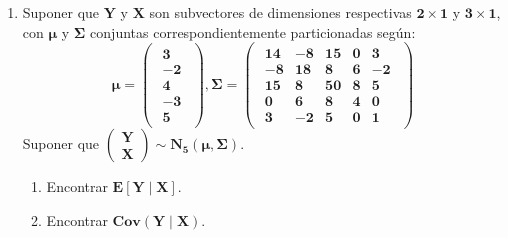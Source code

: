 \documentclass[11pt,a4paper]{article}
\begin{document}
\begin{enumerate}[label=\arabic*.]
\newpage
\bfseries
\item Suponer que $\mathbf{Y}$ y $\mathbf{X}$ son subvectores de dimensiones respectivas $\mathbf{2 \times 1}$ y $\mathbf{3 \times 1}$, con $\mathbf{\mu}$ y $\mathbf{\Sigma}$ conjuntas correspondientemente particionadas según:
$$\mathbf{\mu = \begin{pmatrix}\begin{array}{c}
\mathbf{3} \\
\mathbf{-2} \\ \hline
\mathbf{4} \\
\mathbf{-3} \\
\mathbf{5}
\end{array}\end{pmatrix}, \Sigma = \begin{pmatrix}\begin{array}{cc|ccc}
\mathbf{14} & \mathbf{-8} & \mathbf{15} & \mathbf{0} & \mathbf{3} \\
\mathbf{-8} & \mathbf{18} & \mathbf{8} & \mathbf{6} & \mathbf{-2} \\ \hline
\mathbf{15} & \mathbf{8} & \mathbf{50} & \mathbf{8} & \mathbf{5} \\
\mathbf{0} & \mathbf{6} & \mathbf{8} & \mathbf{4} & \mathbf{0} \\
\mathbf{3} & \mathbf{-2} & \mathbf{5} & \mathbf{0} & \mathbf{1}
\end{array}\end{pmatrix}}$$
Suponer que $\mathbf{\begin{pmatrix} \mathbf{Y} \\ \mathbf{X} \end{pmatrix} \sim N_{5}(\mu, \Sigma)}$.
\begin{enumerate}[label=\alph*)]
\item Encontrar $\mathbf{E[Y \mid X]}$.
\item Encontrar $\mathbf{Cov(Y \mid X)}$.
\end{enumerate}
\vspace{0.5cm}
\normalfont


\end{enumerate}
\end{document}

